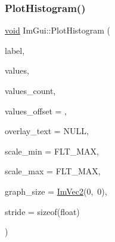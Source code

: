 \subsubsection{\texorpdfstring{Plot\+Histogram()}{PlotHistogram()}\hspace{0.1cm}{\footnotesize\ttfamily [1/2]}}
{\footnotesize\ttfamily \hyperlink{imgui__impl__opengl3__loader_8h_ac668e7cffd9e2e9cfee428b9b2f34fa7}{void} Im\+Gui\+::\+Plot\+Histogram (\begin{DoxyParamCaption}\item[{const char $\ast$}]{label,  }\item[{const float $\ast$}]{values,  }\item[{int}]{values\+\_\+count,  }\item[{int}]{values\+\_\+offset = {},  }\item[{const char $\ast$}]{overlay\+\_\+text = {\ttfamily NULL},  }\item[{float}]{scale\+\_\+min = {\ttfamily FLT\+\_\+MAX},  }\item[{float}]{scale\+\_\+max = {\ttfamily FLT\+\_\+MAX},  }\item[{\hyperlink{structImVec2}{Im\+Vec2}}]{graph\+\_\+size = {\ttfamily \hyperlink{structImVec2}{Im\+Vec2}(0,~0)},  }\item[{int}]{stride = {\ttfamily sizeof(float)} }\end{DoxyParamCaption})}

\mbox{\label{namespaceImGui_af8089203baf8cf723a158c9e34bda2a4}} 
